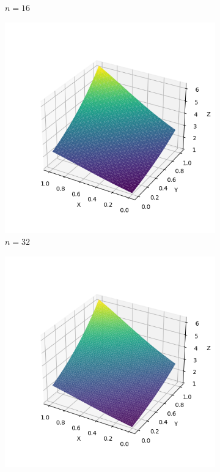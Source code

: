 \documentclass[lang=cn,a4paper,newtx,bibend=bibtex]{elegantpaper}
\begin{document}
\begin{figure}[H]
\begin{subfigure}[b]{0.18\textwidth}
      \caption{$n= 16$}
  \end{subfigure}
  \hfill
  \begin{subfigure}[b]{0.18\textwidth}
      \includegraphics[width=\textwidth]{../../res_bac/res-[data|1-Dirichlet-regular-c32].png}
      \caption{$n = 32$}
  \end{subfigure}
  \hfill
  \begin{subfigure}[b]{0.18\textwidth}
      \includegraphics[width=\textwidth]{../../res_bac/res-[data|1-Dirichlet-regular-d64].png}

\end{subfigure}
\end{figure}
\end{document}
